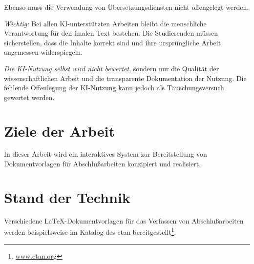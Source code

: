 \documentclass[11pt,        %
  english,ngerman,          %
  paper=a4,                 %
  captions=tablesignature,  %
  listof=numbered,          %
  bibliography=totoc,       %
  headings=small,           %
  headinclude=false,        %
  footinclude=false,        %
  parskip=half-,            %
  oneside,                  %
  BCOR=15mm,                 %
  DIV=12                    %
  ]{scrbook}                %
\begin{document}
Ebenso muss die Verwendung von Übersetzungsdiensten nicht offengelegt werden.
  
\textit{Wichtig:} Bei allen KI-unterstützten Arbeiten bleibt die menschliche Verantwortung für den finalen Text bestehen. Die Studierenden müssen sicherstellen, dass die Inhalte korrekt sind und ihre ursprüngliche Arbeit angemessen widerspiegeln.
    
\textit{Die KI-Nutzung selbst wird nicht bewertet}, sondern nur die Qualität der wissenschaftlichen Arbeit und die transparente Dokumentation der Nutzung. Die fehlende Offenlegung der KI-Nutzung kann jedoch als Täuschungsversuch gewertet werden.

\section{Ziele der Arbeit}\label{sec:goals}


In dieser Arbeit wird ein interaktives System zur Bereitstellung von Dokumentvorlagen für Abschlußarbeiten konzipiert und realisiert.


\section{Stand der Technik}\label{sec:state_of_art}


Verschiedene \LaTeX-Dokumentvorlagen für das Verfassen von Abschlußarbeiten werden
beispielsweise im Katalog des \gls{ctan}
bereitgestellt\footnote{\href{https://www.ctan.org/}{www.ctan.org}}.

\end{document}

